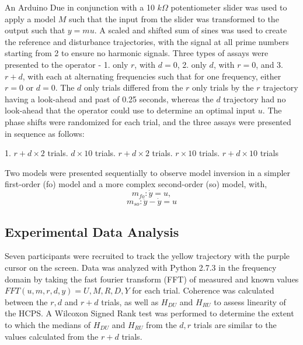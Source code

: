 \documentclass{ifacconf}
\begin{document}
An Arduino Due in conjunction with a 10 $k\Omega$ potentiometer slider was used to apply a model $M$ such that the input from the slider was transformed to the output such that $y=mu$. A scaled and shifted sum of sines was used to create the reference and disturbance trajectories, with the signal at all prime numbers starting from 2 to ensure no harmonic signals. Three types of assays were presented to the operator - 1. only $r$, with $d=0$, 2. only $d$, with $r=0$, and 3. $r+d$, with each at alternating frequencies such that for one frequency, either $r=0$ or $d=0$. The $d$ only trials differed from the $r$ only trials by the $r$ trajectory having a look-ahead and past of 0.25 seconds, whereas the $d$ trajectory had no look-ahead that the operator could use to determine an optimal input $u$. The phase shifts were randomized for each trial, and the three assays were presented in sequence as follows: 
\begin{center}
1. $r+d \times 2$ trials. $d \times 10$ trials. $r+d \times 2$ trials. $r \times 10$ trials. $r+d \times 10$ trials\newline
\end{center}

Two models were presented sequentially to observe model inversion in a simpler first-order (fo) model and a more complex second-order (so) model, with,
\begin{equation} \label{eq:Mfo}
{m_{fo}: \dot{y}=u, }
\end{equation} 
\begin{equation} \label{eq:Mso}
{m_{so}: \ddot{y}-\dot{y}=u}
\end{equation} 

\subsection{Experimental Data Analysis}

Seven participants were recruited to track the yellow trajectory with the purple cursor on the screen. Data was analyzed with Python 2.7.3 in the frequency domain by taking the fast fourier transform (FFT) of measured and known values $FFT(u,m,r,d,y)=U,M,R,D,Y$ for each trial. Coherence was calculated between the $r,d$ and $r+d$ trials, as well as $H_{DU}$ and $H_{RU}$ to assess linearity of the HCPS. A Wilcoxon Signed Rank test was performed to determine the extent to which the medians of $H_{DU}$ and $H_{RU}$ from the $d,r$ trials are similar to the values calculated from the $r+d$ trials. 
\end{document}
